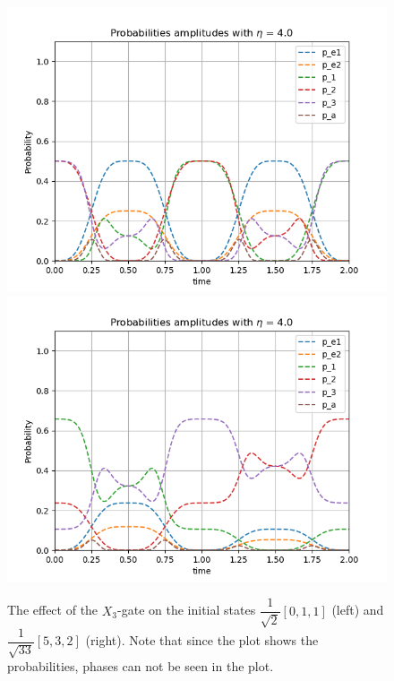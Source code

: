 \begin{figure}[H]
\label{fig:pop_X}
\includegraphics[scale=0.5]{figures/pop_plot_X011.png}
\includegraphics[scale=0.5]{figures/pop_plot_X532.png}
\caption{The effect of the $X_3$-gate on the initial states $\dfrac{1}{\sqrt{2}}[0,1,1]$ (left) and $\dfrac{1}{\sqrt{33}}[5,3,2]$ (right). Note that since the plot shows the probabilities, phases can not be seen in the plot.}
\end{figure}

